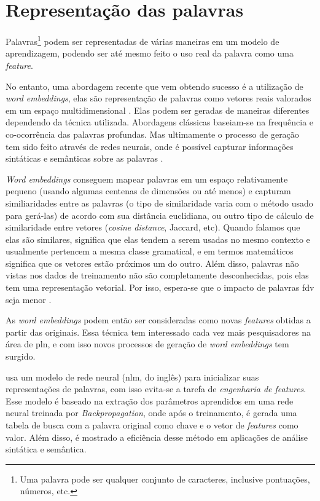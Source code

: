 \section{Representação das palavras}\label{sec:representacaodaspalavras}

Palavras\footnote{Uma palavra pode ser qualquer conjunto de caracteres, inclusive pontuações, números, etc.} podem ser representadas de várias maneiras em um modelo de aprendizagem, podendo ser até mesmo feito o uso real da palavra como uma \textit{feature}.

No entanto, uma abordagem recente que vem obtendo sucesso é a utilização de \textit{word embeddings}, elas são representação de palavras como vetores reais valorados em um espaço multidimensional \cite{turian2010word}. Elas podem ser geradas de maneiras diferentes dependendo da técnica utilizada. Abordagens clássicas baseiam-se na frequência e co-ocorrência das palavras profundas. Mas ultimamente o processo de geração tem sido feito através de redes neurais, onde é possível capturar informações sintáticas e semânticas sobre as palavras \cite{collobert2011natural}.

\textit{Word embeddings} conseguem mapear palavras em um espaço relativamente pequeno (usando algumas centenas de dimensões ou até menos) e capturam similiaridades entre as palavras (o tipo de similaridade varia com o método usado para gerá-las) de acordo com sua distância euclidiana, ou outro tipo de cálculo de similaridade entre vetores (\textit{cosine distance}, Jaccard, etc). Quando falamos que elas são similares, significa que elas tendem a serem usadas no mesmo contexto e usualmente pertencem a mesma classe gramatical, e em termos matemáticos significa que os vetores estão próximos um do outro. Além disso, palavras não vistas nos dados de treinamento não são completamente desconhecidas, pois elas tem uma representação vetorial. Por isso, espera-se que o impacto de palavras \ac{fdv} seja menor \cite{fonseca2015evaluating}.

As \textit{word embeddings} podem então ser consideradas como novas \textit{features} obtidas a partir das originais. Essa técnica tem interessado cada vez mais pesquisadores na área de \ac{pln}, e com isso novos processos de geração de \textit{word embeddings} tem surgido.

 usa um modelo de rede neural (\ac{nlm}, do inglês) para inicializar suas representações de palavras, com isso evita-se a tarefa de \textit{engenharia de features}. Esse modelo é baseado na extração dos parâmetros aprendidos em uma rede neural treinada por \textit{Backpropagation}, onde após o treinamento, é gerada uma tabela de busca com a palavra original como chave e o vetor de \textit{features} como valor. Além disso, é mostrado a eficiência desse método em aplicações de análise sintática e semântica.

